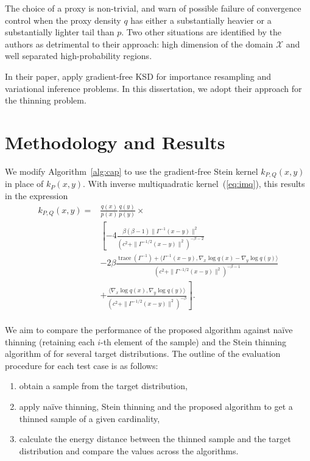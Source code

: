 \documentclass[11pt,a4paper]{report}
\DeclareMathOperator{\trace}{trace}
\begin{document}
The choice of a proxy is non-trivial, and \cite{fisherGradientFreeKernelStein2024} warn of possible failure of convergence control when the proxy density $q$ has either a substantially heavier or a substantially lighter tail than $p$. Two other situations are identified by the authors as detrimental to their approach: high dimension of the domain $\mathcal{X}$ and well separated high-probability regions.

In their paper, \cite{fisherGradientFreeKernelStein2024} apply gradient-free KSD for importance resampling and variational inference problems. In this dissertation, we adopt their approach for the thinning problem.

\chapter{Methodology and Results}

We modify Algorithm~\ref{alg:cap} to use the gradient-free Stein kernel $k_{P,Q}(x,y)$ in place of $k_P(x, y)$. With inverse multiquadratic kernel~(\ref{eq:imq}), this results in the expression
\begin{equation}
\begin{aligned}
k_{P,Q}(x, y)
= &\frac{q(x)}{p(x)} \frac{q(y)}{p(y)} \times \\
 &\left[ -4 \frac{\beta(\beta-1) \| \Gamma^{-1}(x - y)\|^2}{(c^2 + \| \Gamma^{-1/2}(x-y)\|^2)^{-\beta-2}} \right.  \\
&- 2 \beta \frac{\trace(\Gamma^{-1}) + \langle \Gamma^{-1} (x - y), \nabla_x \log q(x) - \nabla_y \log q(y)\rangle}{(c^2 + \| \Gamma^{-1/2}(x-y)\|^2)^{-\beta-1}} \\
& \left. + \frac{\langle \nabla_x \log q(x), \nabla_y \log q(y) \rangle}{(c^2 + \| \Gamma^{-1/2}(x-y)\|^2)^{-\beta}} \right]. \\
\end{aligned}
\label{eq:k_Q}
\end{equation}

We aim to compare the performance of the proposed algorithm against na\"ive thinning (retaining each $i$-th element of the sample) and the Stein thinning algorithm of \cite{riabizOptimalThinningMCMC2022} for several target distributions. The outline of the evaluation procedure for each test case is as follows:
\begin{enumerate}
\item obtain a sample from the target distribution,
\item apply na\"ive thinning, Stein thinning and the proposed algorithm to get a thinned sample of a given cardinality,
\item calculate the energy distance between the thinned sample and the target distribution and compare the values across the algorithms.
\end{enumerate}
\end{document}
